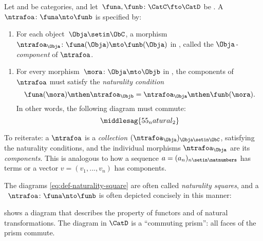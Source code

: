\begin{ctdefinition}
    \label{def:natural-transformation}
    Let \CatC and \CatD be categories, and let~$\funa,\funb\colon \CatC\fto \CatD$ be .
    A ~$\ntrafoa \colon \funa \nto \funb$ is specified by:

    \constit
    \begin{enumerate}
        \item For each object~$\Obja\setin \ObC$, a morphism $\ntrafoa_\Obja \colon \funa(\Obja)\mto \funb(\Obja)$ in \CatD, called the $\Obja$\emph{-component} of $\ntrafoa$.
    \end{enumerate}
    \condit
    \begin{enumerate}
        \item For every morphism~$\mora\colon \Obja\mto \Objb$ in \CatC, the components of $\ntrafoa$ must satisfy the \emph{naturality condition}
              \begin{equation}
                  \funa(\mora)\mthen \ntrafoa_\Objb = \ntrafoa_\Obja\mthen \funb(\mora).
              \end{equation}
              In other words, the following diagram must commute:
              \begin{equation}
                  \label{eq:def-naturality-square}
                  \middlesag{55_natural_2}
              \end{equation}
    \end{enumerate}
\end{ctdefinition}

To reiterate: a  $\ntrafoa$ is a \emph{collection} $(\ntrafoa_\Obja)_{\Obja \setin \ObC}$, satisfying the naturality conditions, and the individual morphisms $\ntrafoa_\Obja$ are its \emph{components}.
This is analogous to how a sequence $a = (a_n)_{n \setin \natnumbers}$ has terms or a vector $v = (v_1, .
    .., v_n)$ has components.

The diagrams \cref{eq:def-naturality-square} are often called \emph{naturality squares}, and a ~$\ntrafoa \colon \funa\nto \funb$ is often depicted concisely in this manner:

 shows a diagram that describes the property of functors and of natural transformations.
The diagram in $\CatD$ is a ``commuting prism'': all faces of the prism commute.

\begin{figure}[h]
    \centering
    \begin{ctdefinitionshade}
        \small
    \end{ctdefinitionshade}
    \caption{}
    \label{fig:nat_trans_graphically}
\end{figure}

